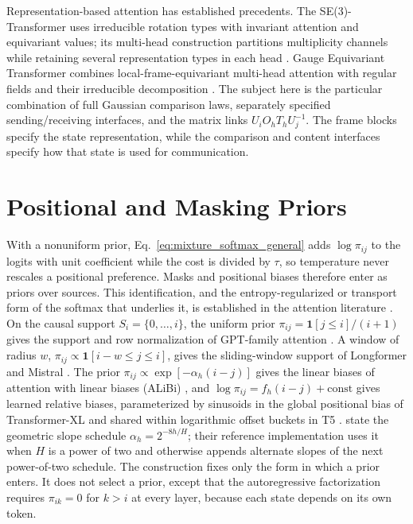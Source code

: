\documentclass[twoside,11pt]{article}
\begin{document}
Representation-based attention has established precedents. The SE(3)-Transformer uses irreducible rotation types with invariant attention and equivariant values; its multi-head construction partitions multiplicity channels while retaining several representation types in each head \citep[Secs.~2.3 and 3.2, App.~D.3]{fuchs2020se3}. Gauge Equivariant Transformer combines local-frame-equivariant multi-head attention with regular fields and their irreducible decomposition \citep[Secs.~4.1--4.2]{He2021GaugeEquivariantTransformer}. The subject here is the particular combination of full Gaussian comparison laws, separately specified sending/receiving interfaces, and the matrix links $U_iO_hT_hU_j^{-1}$. The frame blocks specify the state representation, while the comparison and content interfaces specify how that state is used for communication.


\section{Positional and Masking Priors}
\label{sec:nonuniform_priors}

With a nonuniform prior, Eq.~\eqref{eq:mixture_softmax_general} adds $\log\pi_{ij}$ to the logits with unit coefficient while the cost is divided by $\tau$, so temperature never rescales a positional preference. Masks and positional biases therefore enter as priors over sources. This identification, and the entropy-regularized or transport form of the softmax that underlies it, is established in the attention literature \citep{Niculae2017Regularized,Litman2025EOT,Bianchessi2026BAM,Litman2026AttentionPriors}. On the causal support $S_i=\{0,\ldots,i\}$, the uniform prior $\pi_{ij}=\mathbf{1}[j\le i]/(i+1)$ gives the support and row normalization of GPT-family attention \citep{radford2019language}. A window of radius $w$, $\pi_{ij}\propto\mathbf{1}[i-w\le j\le i]$, gives the sliding-window support of Longformer and Mistral \citep{beltagy2020longformer,jiang2023mistral}. The prior $\pi_{ij}\propto\exp[-\alpha_h(i-j)]$ gives the linear biases of attention with linear biases (ALiBi) \citep{press2022train}, and $\log\pi_{ij}=f_h(i-j)+\mathrm{const}$ gives learned relative biases, parameterized by sinusoids in the global positional bias of Transformer-XL and shared within logarithmic offset buckets in T5 \citep{dai2019transformerxl,raffel2020exploring}. \citet{press2022train} state the geometric slope schedule $\alpha_h=2^{-8h/H}$; their reference implementation uses it when $H$ is a power of two and otherwise appends alternate slopes of the next power-of-two schedule. The construction fixes only the form in which a prior enters. It does not select a prior, except that the autoregressive factorization requires $\pi_{ik}=0$ for $k>i$ at every layer, because each state depends on its own token.
\end{document}
